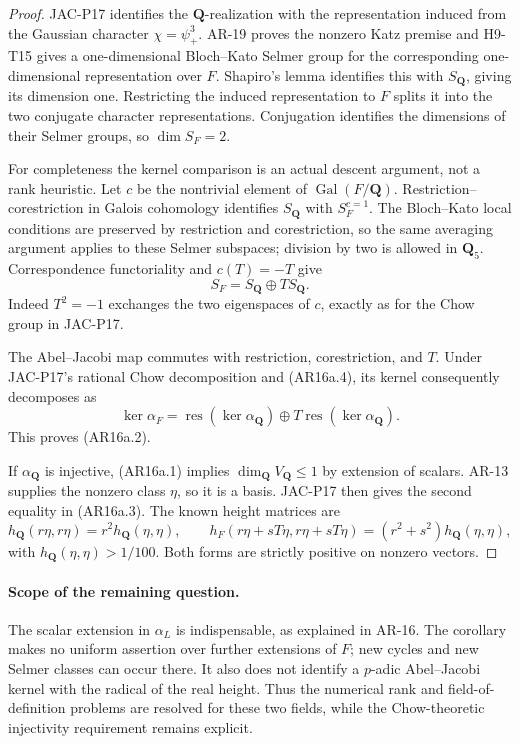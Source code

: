 \begin{proof}
JAC-P17 identifies the \(\mathbf Q\)-realization with the
representation induced from the Gaussian character
\(\chi=\psi_+^3\). AR-19 proves the nonzero Katz premise and
H9-T15 gives a one-dimensional Bloch--Kato Selmer group for the
corresponding one-dimensional representation over \(F\).
Shapiro's lemma identifies this with \(S_{\mathbf Q}\), giving
its dimension one. Restricting the induced representation to
\(F\) splits it into the two conjugate character representations.
Conjugation identifies the dimensions of their Selmer groups,
so \(\dim S_F=2\).

For completeness the kernel comparison is an actual descent
argument, not a rank heuristic. Let \(c\) be the nontrivial
element of \(\operatorname{Gal}(F/\mathbf Q)\).
Restriction--corestriction in Galois cohomology identifies
\(S_{\mathbf Q}\) with \(S_F^{c=1}\).
The Bloch--Kato local conditions are preserved by restriction
and corestriction, so the same averaging argument applies to
these Selmer subspaces; division by two is allowed in
\(\mathbf Q_5\). Correspondence functoriality and
\(c(T)=-T\) give
\[
                S_F=S_{\mathbf Q}\oplus T S_{\mathbf Q}.
                                                               \tag{AR16a.4}
\]
Indeed \(T^2=-1\) exchanges the two eigenspaces of \(c\),
exactly as for the Chow group in JAC-P17.

The Abel--Jacobi map commutes with restriction, corestriction,
and \(T\). Under JAC-P17's rational Chow decomposition and
(AR16a.4), its kernel consequently decomposes as
\[
 \ker\alpha_F=
       \operatorname{res}(\ker\alpha_{\mathbf Q})
          \oplus T\operatorname{res}(\ker\alpha_{\mathbf Q}).
                                                               \tag{AR16a.5}
\]
This proves (AR16a.2).

If \(\alpha_{\mathbf Q}\) is injective, (AR16a.1) implies
\(\dim_{\mathbf Q}V_{\mathbf Q}\le1\) by extension of scalars.
AR-13 supplies the nonzero class \(\eta\), so it is a basis.
JAC-P17 then gives the second equality in (AR16a.3).
The known height matrices are
\[
 h_{\mathbf Q}(r\eta,r\eta)=r^2h_{\mathbf Q}(\eta,\eta),
 \qquad
 h_F(r\eta+sT\eta,r\eta+sT\eta)
       =(r^2+s^2)h_{\mathbf Q}(\eta,\eta),
\]
with \(h_{\mathbf Q}(\eta,\eta)>1/100\).
Both forms are strictly positive on nonzero vectors.
\end{proof}

\paragraph{Scope of the remaining question.}
The scalar extension in \(\alpha_L\) is indispensable, as
explained in AR-16. The corollary makes no uniform assertion
over further extensions of \(F\); new cycles and new Selmer
classes can occur there. It also does not identify a
\(p\)-adic Abel--Jacobi kernel with the radical of the real
height. Thus the numerical rank and field-of-definition
problems are resolved for these two fields, while the
Chow-theoretic injectivity requirement remains explicit.
